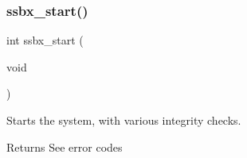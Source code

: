 \subsubsection{\texorpdfstring{ssbx\+\_\+start()}{ssbx\_start()}}
{\footnotesize\ttfamily int ssbx\+\_\+start (\begin{DoxyParamCaption}\item[{void}]{ }\end{DoxyParamCaption})}



Starts the system, with various integrity checks.

\begin{DoxyReturn}{Returns}
See error codes
\end{DoxyReturn}
